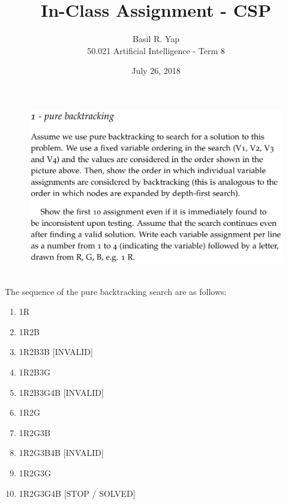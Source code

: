 \documentclass[12pt]{article}
\newenvironment{solution}[2][Solution]{\begin{trivlist}
\item[\hskip \labelsep {\bfseries #1}]}{\end{trivlist}}
\begin{document}
 
 
\title{In-Class Assignment - CSP}%
\author{Basil R. Yap\\ %
50.021 Artificial Intelligence - Term 8} %
\date{July 26, 2018}
\maketitle

\begin{figure}[h!]
\includegraphics[width=\linewidth]{./assets/201807261942.png}
\end{figure}

\begin{solution}{}~\\
The sequence of the pure backtracking search are as follows:\begin{enumerate}
\item 1R
\item 1R2B
\item 1R2B3B [INVALID]
\item 1R2B3G
\item 1R2B3G4B [INVALID]
\item 1R2G
\item 1R2G3B
\item 1R2G3B4B [INVALID]
\item 1R2G3G
\item 1R2G3G4B [STOP / SOLVED]
\end{enumerate}
\end{solution}
\end{document}
